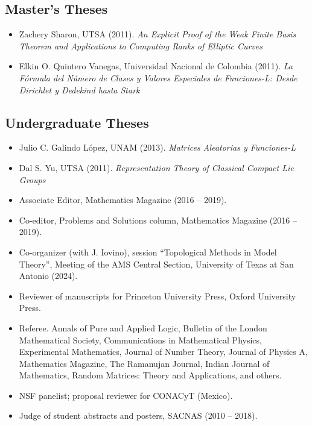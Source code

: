 \documentclass[11pt,a4paper,ragged2e,withhyper]{altacv}
\begin{document}
\subsection*{Master's Theses}
\begin{itemize}
  \item Zachery Sharon, UTSA (2011). \emph{An Explicit Proof of the Weak Finite Basis Theorem and Applications to Computing Ranks of Elliptic Curves}
  \item Elkin O. Quintero Vanegas, Universidad Nacional de Colombia (2011). \emph{La Fórmula del Número de Clases y Valores Especiales de Funciones-L: Desde Dirichlet y Dedekind hasta Stark}
\end{itemize}

\subsection*{Undergraduate Theses}
\begin{itemize}
  \item Julio C. Galindo López, UNAM (2013). \emph{Matrices Aleatorias y Funciones-L}
  \item Dal S. Yu, UTSA (2011). \emph{Representation Theory of Classical Compact Lie Groups}
\end{itemize}

\begin{itemize}
  \item Associate Editor, Mathematics Magazine (2016 -- 2019).
  \item Co-editor, Problems and Solutions column, Mathematics Magazine (2016 -- 2019).
  \item Co-organizer (with J. Iovino), session ``Topological Methods in Model Theory'', Meeting of the AMS Central Section, University of Texas at San Antonio (2024).
  \item Reviewer of manuscripts for Princeton University Press, Oxford University Press.
  \item Referee. Annals of Pure and Applied Logic, Bulletin of the London Mathematical Society, Communications in Mathematical Physics, Experimental Mathematics, Journal of Number Theory, Journal of Physics A, Mathematics Magazine, The Ramanujan Journal, Indian Journal of Mathematics, Random Matrices: Theory and Applications, and others.
  \item NSF panelist; proposal reviewer for CONACyT (Mexico).
  \item Judge of student abstracts and posters, SACNAS (2010 -- 2018).
\end{itemize}
\end{document}

